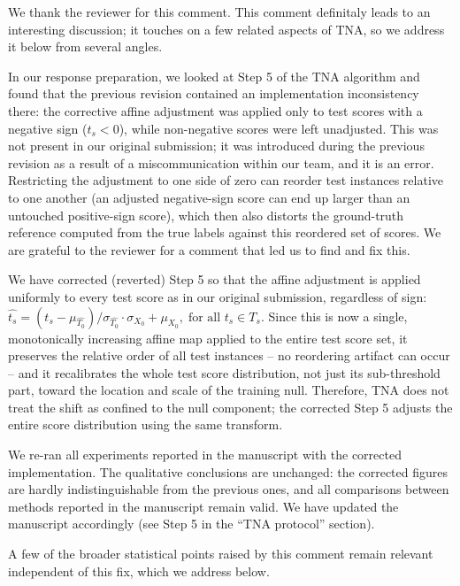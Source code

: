 \documentclass{article}
\newcommand{\response}[1]{\vspace*{1ex} \color{blue} \noindent #1 \color{black}
\vspace*{2ex}}
\begin{document}
\response{We thank the reviewer for this comment. This comment definitaly leads to an interesting discussion; it touches on a few related aspects of TNA, so we address it below from several angles.

In our response preparation, we looked at Step 5 of the TNA algorithm and found that the previous revision contained an implementation inconsistency there: the corrective affine adjustment was applied only to test scores with a negative sign ($t_s<0$), while non-negative scores were left unadjusted. This was not present in our original submission; it was introduced during the previous revision as a result of a miscommunication within our team, and it is an error. Restricting the adjustment to one side of zero can reorder test instances relative to one another (an adjusted negative-sign score can end up larger than an untouched positive-sign score), which then also distorts the ground-truth reference computed from the true labels against this reordered set of scores. We are grateful to the reviewer for a comment that led us to find and fix this.

We have corrected (reverted) Step 5 so that the affine adjustment is applied uniformly to every test score as in our original submission, regardless of sign:
$\hat{t_s} = (t_s-\mu_{\hat{T_0}})/\sigma_{\hat{T_0}} \cdot \sigma_{X_0} + \mu_{X_0}, \; \text{for all } t_s\in T_s.$
Since this is now a single, monotonically increasing affine map applied to the entire test score set, it preserves the relative order of all test instances -- no reordering artifact can occur -- and it recalibrates the whole test score distribution, not just its sub-threshold part, toward the location and scale of the training null. Therefore, TNA does not treat the shift as confined to the null component; the corrected Step 5 adjusts the entire score distribution using the same transform.

We re-ran all experiments reported in the manuscript with the corrected implementation. The qualitative conclusions are unchanged: the corrected figures are hardly indistinguishable from the previous ones, and all comparisons between methods reported in the manuscript remain valid. We have updated the manuscript accordingly (see Step 5 in the ``TNA protocol'' section).

A few of the broader statistical points raised by this comment remain relevant independent of this fix, which we address below.

\

}
\end{document}
